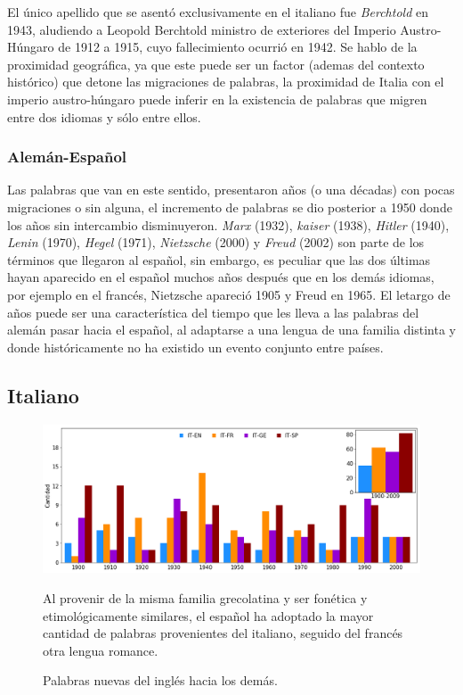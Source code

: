El único apellido que se asentó exclusivamente en el  italiano fue \textit{Berchtold} en 1943, aludiendo a Leopold Berchtold ministro de exteriores del Imperio Austro-Húngaro de 1912 a 1915, cuyo fallecimiento ocurrió en 1942.  Se hablo de la proximidad geográfica, ya que este puede ser un factor (ademas del contexto histórico) que detone las migraciones de palabras, la proximidad de Italia con el imperio austro-húngaro puede inferir en la existencia de  palabras que migren entre  dos idiomas y sólo entre ellos. 

  
\subsubsection*{Alemán-Español}%

Las palabras que van en este sentido,  presentaron años (o una décadas)  con pocas migraciones o sin alguna, el incremento de palabras se dio posterior a 1950 donde los años sin intercambio disminuyeron.  \textit{Marx} (1932), \textit{kaiser} (1938), \textit{Hitler} (1940), \textit{Lenin} (1970), \textit{Hegel} (1971),  \textit{Nietzsche} (2000) y \textit{Freud} (2002) son parte de los términos que llegaron al español,  sin embargo, es peculiar que las dos últimas hayan aparecido en el español muchos años después que en los demás idiomas, por ejemplo en el francés,  Nietzsche apareció 1905 y Freud en 1965. El letargo de años puede ser una característica del tiempo que les lleva  a las  palabras del alemán pasar hacia el español, al adaptarse a una lengua de una familia distinta y donde históricamente no ha existido un evento conjunto entre países. 




\clearpage
\subsection{Italiano}%

\begin{figure}[h!]
	\centering
	\includegraphics[scale=.38]{Cap_3/NC_IT.png}
	\label{fig.NC_IT}
	\caption{Palabras nuevas del inglés hacia los demás.}
	\smallskip
	\small
	Al provenir de la misma familia grecolatina y ser fonética y etimológicamente similares, el español ha adoptado la mayor cantidad de palabras provenientes del italiano,  seguido del francés otra lengua romance.  
\end{figure}




